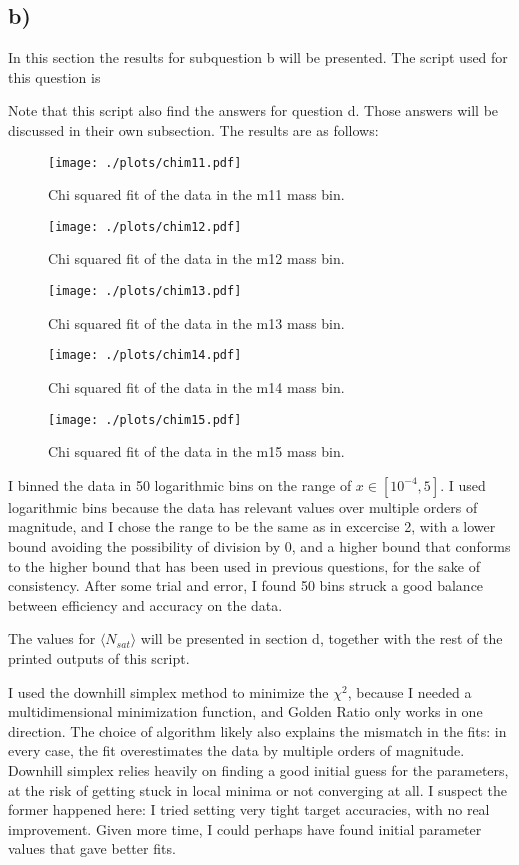 \subsection*{b)}
In this section the results for subquestion b will be presented. The script used for this question is 

Note that this script also find the answers for question d. Those answers will be discussed in their own subsection.
The results are as follows:
\begin{figure}[H]
    \centering
    \texttt{[image: ./plots/chim11.pdf]}
    \caption{Chi squared fit of the data in the m11 mass bin.}
    \label{fig:chim11}
\end{figure}

\begin{figure}[H]
    \centering
    \texttt{[image: ./plots/chim12.pdf]}
    \caption{Chi squared fit of the data in the m12 mass bin.}
    \label{fig:chim12}
\end{figure}

\begin{figure}[H]
    \centering
    \texttt{[image: ./plots/chim13.pdf]}
    \caption{Chi squared fit of the data in the m13 mass bin.}
    \label{fig:chim13}
\end{figure}

\begin{figure}[H]
    \centering
    \texttt{[image: ./plots/chim14.pdf]}
    \caption{Chi squared fit of the data in the m14 mass bin.}
    \label{fig:chim14}
\end{figure}

\begin{figure}[H]
    \centering
    \texttt{[image: ./plots/chim15.pdf]}
    \caption{Chi squared fit of the data in the m15 mass bin.}
    \label{fig:chim15}
\end{figure}

I binned the data in 50 logarithmic bins on the range of $x \in [ 10^{-4},5]$. I used logarithmic bins because the data has relevant values over multiple orders of magnitude, and I chose the range to be the same as in excercise 2, with a lower bound avoiding the possibility of division by 0, and a higher bound that conforms to the higher bound that has been used in previous questions, for the sake of consistency. After some trial and error, I found 50 bins struck a good balance between efficiency and accuracy on the data.

The values for $\langle N_{sat} \rangle$ will be presented in section d, together with the rest of the printed outputs of this script.

I used the downhill simplex method to minimize the $\chi^2$, because I needed a multidimensional minimization function, and Golden Ratio only works in one direction. The choice of algorithm likely also explains the mismatch in the fits: in every case, the fit overestimates the data by multiple orders of magnitude. Downhill simplex relies heavily on finding a good initial guess for the parameters, at the risk of getting stuck in local minima or not converging at all. I suspect the former happened here: I tried setting very tight target accuracies, with no real improvement. Given more time, I could perhaps have found initial parameter values that gave better fits. 
